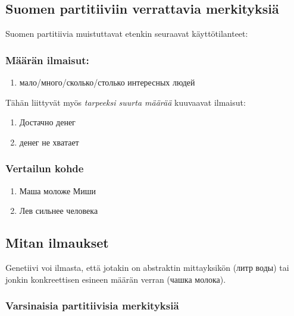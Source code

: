 \documentclass[]{scrreprt}
\providecommand{\tightlist}{%
  \setlength{\itemsep}{0pt}\setlength{\parskip}{0pt}}
\begin{document}
\subsection{Suomen partitiiviin verrattavia
merkityksiä}\label{suomen-partitiiviin-verrattavia-merkityksiuxe4}

Suomen partitiivia muistuttavat etenkin seuraavat käyttötilanteet:

\subsubsection{Määrän ilmaisut:}\label{muxe4uxe4ruxe4n-ilmaisut}

\begin{enumerate}
\def\labelenumi{(\arabic{enumi})}
\setcounter{enumi}{34}
\tightlist
\item
  мало/много/сколько/столько интересных людей
\end{enumerate}

Tähän liittyvät myös \emph{tarpeeksi suurta määrää} kuuvaavat ilmaisut:

\begin{enumerate}
\def\labelenumi{(\arabic{enumi})}
\setcounter{enumi}{35}
\tightlist
\item
  Достачно денег
\item
  денег не хватает
\end{enumerate}

\subsubsection{Vertailun kohde}\label{vertailun-kohde}

\begin{enumerate}
\def\labelenumi{(\arabic{enumi})}
\setcounter{enumi}{37}
\tightlist
\item
  Маша моложе Миши
\item
  Лев сильнее человека
\end{enumerate}

\subsection{Mitan ilmaukset}\label{mitan-ilmaukset}

Genetiivi voi ilmasta, että jotakin on abstraktin mittayksikön (литр
воды) tai jonkin konkreettisen esineen määrän verran (чашка молока).

\subsubsection{Varsinaisia partitiivisia
merkityksiä}\label{varsinaisia-partitiivisia-merkityksiuxe4}
\end{document}

